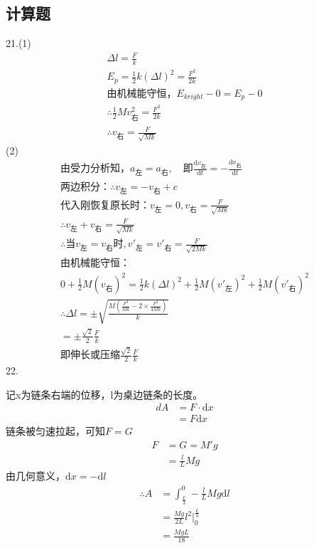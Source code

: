 \documentclass[blue, pad]{./templete/qyxfnote}
\newcommand{\di}[1]{\mathrm{d}#1}
\newcommand{\dy}[2]{\frac{\di{#1}}{\di{#2}}}
\begin{document}
	\subsection{计算题}
	21.(1)
	\begin{gather*}
	\Delta l=\frac{F}{k}\\
	E_p=\frac{1}{2}k(\Delta l)^2=\frac{F^2}{2k}\\
	\text{由机械能守恒，}E_{kright}-0=E_p-0\\
	\therefore\frac{1}{2}Mv_{\text{右}}^2=\frac{F^2}{2k}\\
	\therefore v_{\text{右}}=\frac{F}{\sqrt{Mk}}
	\end{gather*}
	(2)
	\begin{gather*}
	\text{由受力分析知，}a_{\text{左}}=a_{\text{右}},\quad\text{即}\dy{v_{\text{左}}}{t}=-\dy{v_{\text{右}}}{t}\\
	\text{两边积分：}\therefore v_{\text{左}}=-v_{\text{右}}+c\\
	\text{代入刚恢复原长时：}v_{\text{左}}=0,v_{\text{右}}=\frac{F}{\sqrt{Mk}}\\
	\therefore v_{\text{左}}+v_{\text{右}}=\frac{F}{\sqrt{Mk}}\\
	\therefore\text{当}v_{\text{左}}=v_{\text{右}}\text{时},v'_{\text{左}}=v'_{\text{右}}=\frac{F}{\sqrt{2Mk}}\\
	\text{由机械能守恒：}\\
	0+\frac{1}{2}M(v_{\text{右}})^2=\frac{1}{2}k(\Delta l)^2+\frac{1}{2}M(v'_{\text{左}})^2+\frac{1}{2}M(v'_{\text{右}})^2\\
	\therefore\Delta l=\pm\sqrt{\frac{M\left(\frac{F^2}{Mk}-2\times\frac{F^2}{4Mk}\right)}{k}}\\
	=\pm\frac{\sqrt{2}}{2}\frac{F}{k}\\
	\text{即伸长或压缩}\frac{\sqrt{2}}{2}\frac{F}{k}
	\end{gather*}
	22.\par 
	记x为链条右端的位移，l为桌边链条的长度。
	\begin{align*}
	dA	&=F\cdot\di{x}\\
	&=F\di{x}
	\end{align*}
	链条被匀速拉起，可知$F=G$
	\begin{align*}
	F	&=G=M'g\\
	&=\frac{l}{L}Mg
	\end{align*}
	由几何意义，$\di{x}=-\di{l}$
	\begin{align*}
	\therefore A&=\int_{\frac{L}{3}}^{0} -\frac{l}{L}Mg\di{l}\\
	&=\frac{Mg}{2L}l^2\left.\right|_{0}^{\frac{L}{3}}\\
	&=\frac{MgL}{18}
	\end{align*}
\end{document}
